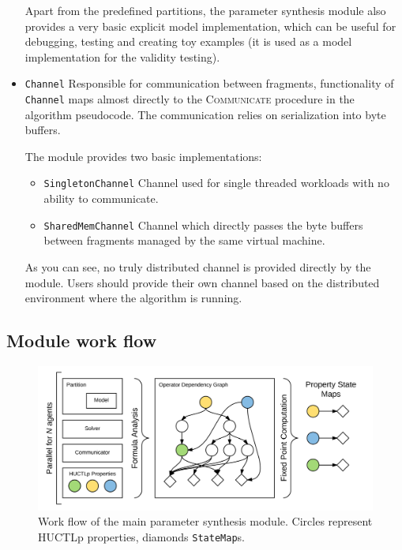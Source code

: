 \begin{itemize}
	Apart from the predefined partitions, the parameter synthesis module also provides a very basic explicit model implementation, which can be useful for debugging, testing and creating toy examples (it is used as a model implementation for the validity testing).

	\item \texttt{Channel} Responsible for communication between fragments, functionality of \texttt{Channel} maps almost directly to the \textsc{Communicate} procedure in the algorithm pseudocode. The communication relies on serialization into byte buffers.
	
	The module provides two basic implementations:
	
	\begin{itemize}
		\item \texttt{SingletonChannel} Channel used for single threaded workloads with no ability to communicate.
		\item \texttt{SharedMemChannel} Channel which directly passes the byte buffers between fragments managed by the same virtual machine.
	\end{itemize}

	As you can see, no truly distributed channel is provided directly by the module. Users should provide their own channel based on the distributed environment where the algorithm is running.

\end{itemize}

\subsection{Module work flow}

\begin{figure}[]
	\centering
	\includegraphics[scale=0.45]{core_workflow.pdf}
	\caption{Work flow of the main parameter synthesis module. Circles represent \ac{HUCTLp} properties, diamonds \texttt{StateMap}s. }
	\label{fig:core_workflow}
\end{figure}

